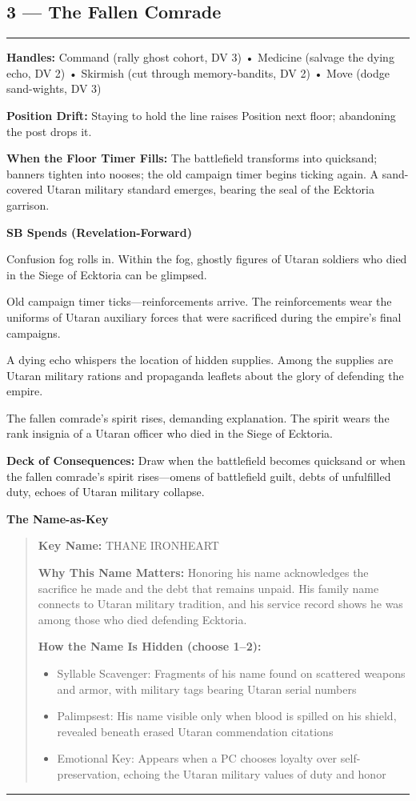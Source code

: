 \documentclass[18pt, letterpaper, twoside]{article}
\newenvironment{floorbox}[1]{%
    \begin{center}
    \begin{minipage}{0.95\textwidth}
    \subsection*{#1}
    \vspace{-0.5em}
    \rule{\textwidth}{0.5pt}
    \vspace{0.5em}
}{%
    \vspace{0.5em}
    \rule{\textwidth}{0.5pt}
    \end{minipage}
    \end{center}
}
\newenvironment{gmnote}[1]{%
    \vspace{0.5em}
    \noindent\textbf{#1}
    \begin{quote}
}{%
    \end{quote}
    \vspace{0.5em}
}
\newcommand{\handles}[1]{\noindent\textbf{Handles:} #1\par}
\newcommand{\sbitem}[2]{\item[#1 SB:] #2}
\newcommand{\deckdraw}[1]{\noindent\textbf{Deck of Consequences:} #1\par}
\newcommand{\keyname}[1]{\noindent\textbf{Key Name:} #1\par}
\newcommand{\nameimportance}[1]{\noindent\textbf{Why This Name Matters:} #1\par}
\begin{document}
\begin{floorbox}{3 --- The Fallen Comrade}
\handles{Command (rally ghost cohort, DV 3) • Medicine (salvage the dying echo, DV 2) • Skirmish (cut through memory-bandits, DV 2) • Move (dodge sand-wights, DV 3)}

\textbf{Position Drift:} Staying to hold the line raises Position next floor; abandoning the post drops it.

\textbf{When the Floor Timer Fills:} The battlefield transforms into quicksand; banners tighten into nooses; the old campaign timer begins ticking again. A sand-covered Utaran military standard emerges, bearing the seal of the Ecktoria garrison.

\textbf{SB Spends (Revelation-Forward)}
\begin{description}[leftmargin=*, style=unboxed]
    \sbitem{1}{Confusion fog rolls in. Within the fog, ghostly figures of Utaran soldiers who died in the Siege of Ecktoria can be glimpsed.}
    \sbitem{2}{Old campaign timer ticks---reinforcements arrive. The reinforcements wear the uniforms of Utaran auxiliary forces that were sacrificed during the empire's final campaigns.}
    \sbitem{3}{A dying echo whispers the location of hidden supplies. Among the supplies are Utaran military rations and propaganda leaflets about the glory of defending the empire.}
    \sbitem{4+}{The fallen comrade's spirit rises, demanding explanation. The spirit wears the rank insignia of a Utaran officer who died in the Siege of Ecktoria.}
\end{description}

\deckdraw{Draw when the battlefield becomes quicksand or when the fallen comrade's spirit rises---omens of battlefield guilt, debts of unfulfilled duty, echoes of Utaran military collapse.}

\begin{gmnote}{The Name-as-Key}
\keyname{THANE IRONHEART}
\nameimportance{Honoring his name acknowledges the sacrifice he made and the debt that remains unpaid. His family name connects to Utaran military tradition, and his service record shows he was among those who died defending Ecktoria.}

\textbf{How the Name Is Hidden (choose 1--2):}
\begin{itemize}[leftmargin=*]
    \item Syllable Scavenger: Fragments of his name found on scattered weapons and armor, with military tags bearing Utaran serial numbers
    \item Palimpsest: His name visible only when blood is spilled on his shield, revealed beneath erased Utaran commendation citations
    \item Emotional Key: Appears when a PC chooses loyalty over self-preservation, echoing the Utaran military values of duty and honor
\end{itemize}


\end{gmnote}
\end{floorbox}
\end{document}
